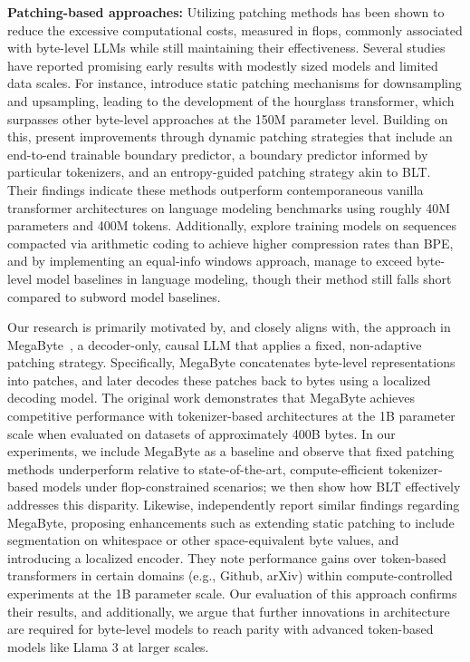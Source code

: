 \textbf{Patching-based approaches:} Utilizing patching methods has been shown to reduce the excessive computational costs, measured in flops, commonly associated with byte-level LLMs while still maintaining their effectiveness. Several studies have reported promising early results with modestly sized models and limited data scales. For instance, \cite{nawrot-etal-2022-hierarchical} introduce static patching mechanisms for downsampling and upsampling, leading to the development of the hourglass transformer, which surpasses other byte-level approaches at the 150M parameter level. Building on this, \cite{nawrot-etal-2023-efficient} present improvements through dynamic patching strategies that include an end-to-end trainable boundary predictor, a boundary predictor informed by particular tokenizers, and an entropy-guided patching strategy akin to {\textsc BLT}. Their findings indicate these methods outperform contemporaneous vanilla transformer architectures on language modeling benchmarks using roughly 40M parameters and 400M tokens. Additionally, \cite{lester2024training} explore training models on sequences compacted via arithmetic coding to achieve higher compression rates than BPE, and by implementing an equal-info windows approach, manage to exceed byte-level model baselines in language modeling, though their method still falls short compared to subword model baselines.

Our research is primarily motivated by, and closely aligns with, the approach in MegaByte~\citep{yu2023megabyte}, a decoder-only, causal LLM that applies a fixed, non-adaptive patching strategy. Specifically, MegaByte concatenates byte-level representations into patches, and later decodes these patches back to bytes using a localized decoding model. The original work demonstrates that MegaByte achieves competitive performance with tokenizer-based architectures at the 1B parameter scale when evaluated on datasets of approximately 400B bytes. In our experiments, we include MegaByte as a baseline and observe that fixed patching methods underperform relative to state-of-the-art, compute-efficient tokenizer-based models under flop-constrained scenarios; we then show how {\textsc BLT} effectively addresses this disparity. Likewise, \cite{slagle2024spacebyte} independently report similar findings regarding MegaByte, proposing enhancements such as extending static patching to include segmentation on whitespace or other space-equivalent byte values, and introducing a localized encoder. They note performance gains over token-based transformers in certain domains (e.g., Github, arXiv) within compute-controlled experiments at the 1B parameter scale. Our evaluation of this approach confirms their results, and additionally, we argue that further innovations in architecture are required for byte-level models to reach parity with advanced token-based models like Llama 3 at larger scales.

